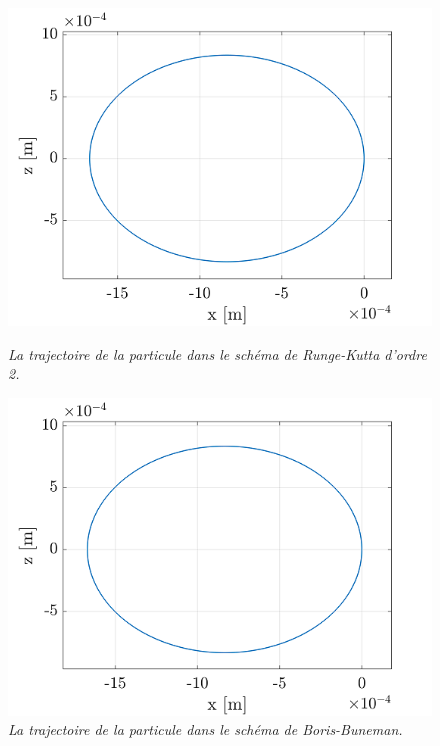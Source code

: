 \documentclass[a4paper,12pt,twoside]{article}
\begin{document}
\begin{figure}[h]
				\begin{minipage}[c]{.46\linewidth}
					\centering
					\includegraphics[scale = 0.6]{traj_RK2_b_iii.png}
					\caption{\em\label{Fig: Traj R-K-2} La trajectoire de la particule dans le sch\'ema de Runge-Kutta d'ordre 2.}
				\end{minipage}
				\hfill%
				\begin{minipage}[c]{.46\linewidth}
					\centering
					\includegraphics[scale = 0.6]{traj_BB_b_iii.png}
					\caption{\em\label{Fig: Traj B-B} La trajectoire de la particule dans le sch\'ema de Boris-Buneman.}
				\end{minipage}
			\end{figure}
\end{document}
